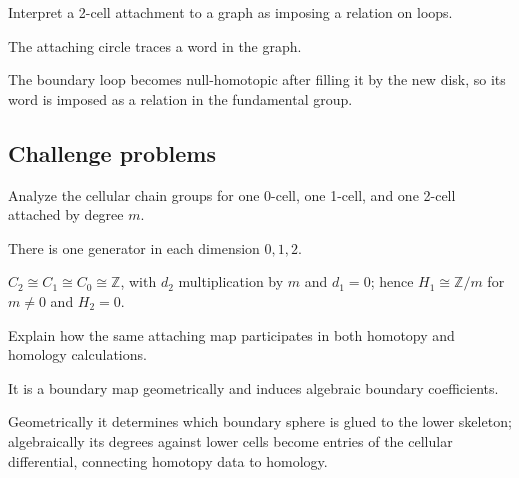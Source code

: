 \begin{exercise}\label{exr:viii05-ped-14}
Interpret a 2-cell attachment to a graph as imposing a relation on loops.
\end{exercise}
\begin{hint}
The attaching circle traces a word in the graph.
\end{hint}
\begin{solution}
The boundary loop becomes null-homotopic after filling it by the new disk, so its word is imposed as a relation in the fundamental group.
\end{solution}

\subsection*{Challenge problems}

\begin{exercise}\label{exr:viii05-ped-15}
Analyze the cellular chain groups for one 0-cell, one 1-cell, and one 2-cell attached by degree $m$.
\end{exercise}
\begin{hint}
There is one generator in each dimension $0,1,2$.
\end{hint}
\begin{solution}
$C_2\cong C_1\cong C_0\cong\mathbb Z$, with $d_2$ multiplication by $m$ and $d_1=0$; hence $H_1\cong\mathbb Z/m$ for $m\ne0$ and $H_2=0$.
\end{solution}

\begin{exercise}\label{exr:viii05-ped-16}
Explain how the same attaching map participates in both homotopy and homology calculations.
\end{exercise}
\begin{hint}
It is a boundary map geometrically and induces algebraic boundary coefficients.
\end{hint}
\begin{solution}
Geometrically it determines which boundary sphere is glued to the lower skeleton; algebraically its degrees against lower cells become entries of the cellular differential, connecting homotopy data to homology.
\end{solution}

